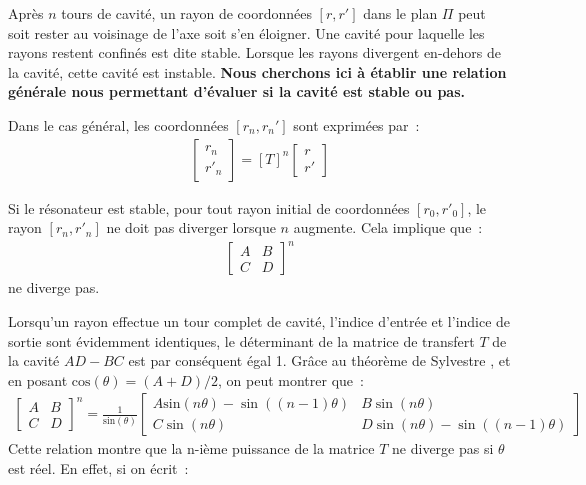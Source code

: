 \documentclass[a4paper]{book}
\begin{document}
Après $n$ tours de cavité, un rayon de coordonnées $\left[r, r'\right]$ dans le plan $\Pi$ peut soit rester au voisinage de l'axe soit s'en éloigner. Une cavité pour laquelle les rayons restent confinés est dite stable. Lorsque les rayons divergent en-dehors de la cavité, cette cavité est instable. 
\textbf{Nous cherchons ici à établir une relation générale nous permettant d'évaluer si la cavité est stable ou pas.}  

Dans le cas général, les coordonnées $\left[r_n, r_n'\right]$ sont exprimées par~:
\begin{gather}
 \begin{bmatrix} r_n \\ r'_n \end{bmatrix}
 =
\left[T\right]^n
   \begin{bmatrix} r \\ r' \end{bmatrix}
\end{gather}

Si le résonateur est stable, pour tout rayon initial de coordonnées $\left[r_0, r'_0\right]$, le rayon $\left[r_n, r'_n\right]$ ne doit pas diverger lorsque $n$ augmente. Cela implique que~:
\begin{gather}
  \begin{bmatrix}
   A & B \\
   C & D 
   \end{bmatrix}^n
\end{gather}
ne diverge pas.

Lorsqu'un rayon effectue un tour complet de cavité, l'indice d'entrée et l'indice de sortie sont évidemment identiques, le déterminant de la matrice de transfert $T$ de la cavité $AD-BC$ est par conséquent égal  1. Grâce au théorème de Sylvestre \cite{bornwolf}, et en posant $\mathrm{cos}(\theta) = (A+D)/2$, on peut montrer que~:
\begin{gather}
  \begin{bmatrix}
   A & B \\
   C & D 
   \end{bmatrix}^n
 =\frac{1}{\mathrm{sin}(\theta)}
   \begin{bmatrix}
   A \mathrm{sin}(n\theta) - \sin\left((n-1)\theta\right) & B\sin (n\theta) \\
   C\sin (n\theta) & D\sin (n\theta) - \sin\left((n-1)\theta \right)
   \end{bmatrix}
\end{gather}
Cette relation montre que la n-ième puissance de la matrice $T$ ne diverge pas si $\theta$ est réel. En effet, si on écrit~:
\end{document}
